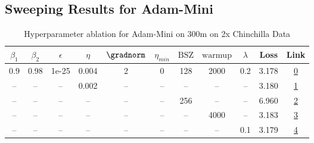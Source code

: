 \subsection{Sweeping Results for Adam-Mini}%
\begin{table}[H]
\centering
\caption{Hyperparameter ablation for Adam-Mini on 300m on 2x Chinchilla Data}
\label{tab:ablation_adam-mini_300m_on_2x_chinchilla_data}
\begin{tabular}{ccccccccccc}
\toprule
$\beta_1$ & $\beta_2$ & $\epsilon$ & $\eta$ & $\gradnorm$ & $\eta_{min}$ & $\mathrm{BSZ}$ & $\mathrm{warmup}$ & $\lambda$ & Loss & Link \\
\midrule
0.9 & 0.98 & 1e-25 & 0.004 & 2 & 0 & 128 & 2000 & 0.2 & 3.178 & \href{https://wandb.ai/stanford-mercury/optimizer-scaling/runs/sweep-300m-12B-mini9676c0lr0.004-wd0.2-minlr0-warmup2000-b10.9-b-80350d}{0} \\
\midrule
-- & -- & -- & 0.002 & -- & -- & -- & -- & -- & 3.180 & \href{https://wandb.ai/stanford-mercury/optimizer-scaling/runs/sweep-300m-12B-mini4cf513lr0.002-wd0.2-minlr0-warmup2000-b10.9-b-df6367}{1} \\
-- & -- & -- & -- & -- & -- & 256 & -- & -- & 6.960 & \href{https://wandb.ai/stanford-mercury/optimizer-scaling/runs/sweep-300m-12B-mini65d3bflr0.004-wd0.2-minlr0-warmup2000-b10.9-b-79c803}{2} \\
-- & -- & -- & -- & -- & -- & -- & 4000 & -- & 3.183 & \href{https://wandb.ai/stanford-mercury/optimizer-scaling/runs/sweep-300m-12B-minic35a69lr0.004-wd0.2-minlr0-warmup4000-b10.9-b-05ae30}{3} \\
-- & -- & -- & -- & -- & -- & -- & -- & 0.1 & 3.179 & \href{https://wandb.ai/stanford-mercury/optimizer-scaling/runs/sweep-300m-12B-minif8c6e5lr0.004-wd0.1-minlr0-warmup2000-b10.9-b-aa6c53}{4} \\
\bottomrule
\end{tabular}
\end{table}

